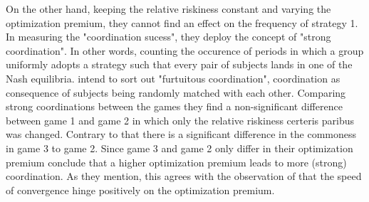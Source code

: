 \documentclass[12pt]{article}
\begin{document}
On the other hand, keeping the relative riskiness constant and varying the
optimization premium, they cannot find an effect on the frequency of 
strategy 1. 
In measuring the "coordination sucess", they deploy the concept of "strong
coordination". 
In other words, counting the occurence of periods in which a group
uniformly adopts a strategy such that every pair of subjects lands in one
of the Nash equilibria. \textcite{dubois_optimization_2012} intend to sort 
out "furtuitous coordination", coordination as consequence of subjects being
randomly matched with each other. Comparing strong coordinations between the
games they find a non-significant difference between game 1 and game 2 in 
which only the relative riskiness certeris paribus was changed. Contrary to 
that there is a significant difference in the commoness in game 3 to game 2.
Since game 3 and game 2 only differ in their optimization premium 
\textcite{dubois_optimization_2012} conclude that a higher optimization
premium leads to more (strong) coordination. As they mention, this agrees
with the observation of \textcite{battalio_optimization_2001} that the 
speed of convergence hinge positively on the optimization premium. 
\end{document}

